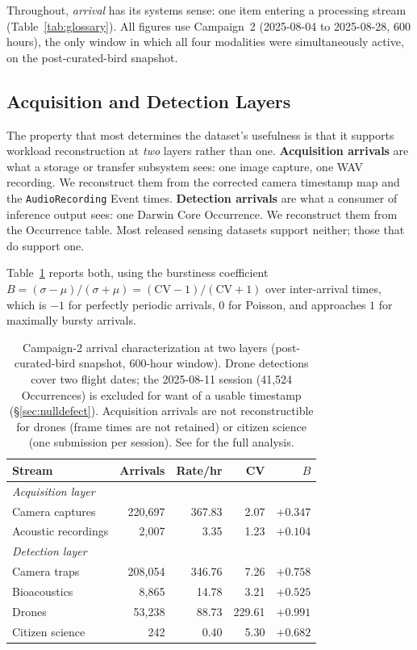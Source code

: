 \documentclass[sigconf]{acmart}
\begin{document}
Throughout, \emph{arrival} has its systems sense: one item entering a
processing stream (Table~\ref{tab:glossary}). All figures use Campaign~2
(2025-08-04 to 2025-08-28, 600 hours), the only window in which all four
modalities were simultaneously active, on the post-curated-bird
snapshot.

\subsection{Acquisition and Detection Layers}

The property that most determines the dataset's usefulness is that it
supports workload reconstruction at \emph{two} layers rather than one.
\textbf{Acquisition arrivals} are what a storage or transfer subsystem
sees: one image capture, one WAV recording. We reconstruct them from the
corrected camera timestamp map and the \texttt{AudioRecording} Event
times. \textbf{Detection arrivals} are what a consumer of inference
output sees: one Darwin Core Occurrence. We reconstruct them from the
Occurrence table. Most released sensing datasets support neither; those
that do support one.

Table~\ref{tab:arrivals} reports both, using the burstiness coefficient
$B = (\sigma-\mu)/(\sigma+\mu) = (\mathrm{CV}-1)/(\mathrm{CV}+1)$ over
inter-arrival times, which is $-1$ for perfectly periodic arrivals, $0$
for Poisson, and approaches $1$ for maximally bursty arrivals.

\begin{table}[t]
\caption{Campaign-2 arrival characterization at two layers
(post-curated-bird snapshot, 600-hour window). Drone detections cover
two flight dates; the 2025-08-11 session (41{,}524 Occurrences) is
excluded for want of a usable timestamp (\S\ref{sec:nulldefect}).
Acquisition arrivals are not reconstructible for drones (frame times are
not retained) or citizen science (one submission per session). See
\cite{smartwilds_workload} for the full analysis.}
\label{tab:arrivals}
\small
\begin{tabular}{lrrrr}
\toprule
\textbf{Stream} & \textbf{Arrivals} & \textbf{Rate/hr} & \textbf{CV} & \textbf{$B$} \\
\midrule
\multicolumn{5}{l}{\emph{Acquisition layer}} \\
Camera captures & 220{,}697 & 367.83 & 2.07 & $+0.347$ \\
Acoustic recordings & 2{,}007 & 3.35 & 1.23 & $+0.104$ \\
\midrule
\multicolumn{5}{l}{\emph{Detection layer}} \\
Camera traps & 208{,}054 & 346.76 & 7.26 & $+0.758$ \\
Bioacoustics & 8{,}865 & 14.78 & 3.21 & $+0.525$ \\
Drones & 53{,}238 & 88.73 & 229.61 & $+0.991$ \\
Citizen science & 242 & 0.40 & 5.30 & $+0.682$ \\
\bottomrule
\end{tabular}
\end{table}
\end{document}
